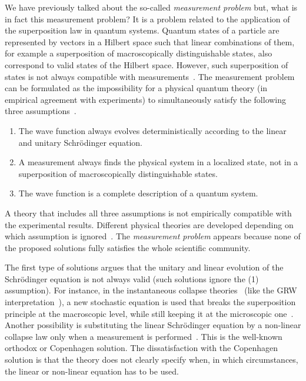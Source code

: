 \documentclass[nofootinbib, secnumarabic, amsmath, nobibnotes,11pt,aps,pra, floatfix]{revtex4-1}
\begin{document}
We have previously talked about the so-called \emph{measurement problem}\cite{om.Dieter,om.maudlin,om.bohm66} but, what is in fact this measurement problem? It is a problem related to the application of the superposition law in quantum systems. Quantum states of a particle are represented by vectors in a Hilbert space such that linear combinations of them, for example a superposition of macroscopically distinguishable states, also correspond to valid states of the Hilbert space.
However, such superposition of states is not always compatible with measurements~\cite{om.bohm66,om.nikolic}. The measurement problem can be formulated as the impossibility for a physical quantum theory (in empirical agreement with experiments) to simultaneously satisfy the following three assumptions~\cite{om.maudlin}.
\begin{enumerate}
\item The wave function always evolves deterministically according to the linear and unitary Schr\"odinger equation.
\item A measurement always finds the physical system in a localized state, not in a superposition of macroscopically distinguishable states.
\item The wave function is a complete description of a quantum system.
\end{enumerate}
A theory that includes all three assumptions is not empirically compatible with the experimental results. Different physical theories are developed depending on which assumption is ignored~\cite{om.herbert}. The \emph{measurement problem} appears because none of the proposed solutions fully satisfies the whole scientific community.  

The first type of solutions argues that the unitary and linear evolution of the Schr\"odinger equation is not always valid (such solutions ignore the (1) assumption).
For instance, in the instantaneous collapse theories~\cite{om.bassi13} (like the GRW interpretation~\cite{om.ghirardi86}), a new stochastic equation is used 
that breaks the superposition principle at the macroscopic level, while still keeping it at the microscopic one~\cite{om.bassi13}.
Another possibility is substituting the linear Schr\"odinger equation by a non-linear collapse law only when a measurement is performed~\cite{om.bohr20}.
This is the well-known orthodox or Copenhagen solution. The dissatisfaction with the Copenhagen solution is that the theory does not clearly specify when, in which circumstances, the linear or non-linear equation has to be used. 
\end{document}
